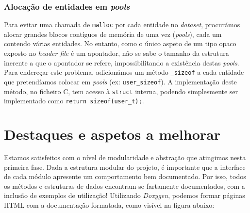 \documentclass[12pt, a4paper]{article}
\begin{document}
\subsubsection{Alocação de entidades em \emph{pools}}

Para evitar uma chamada de \texttt{malloc} por cada entidade no \emph{dataset}, procurámos alocar
grandes blocos contíguos de memória de uma vez (\emph{pools}), cada um contendo várias entidades.
No entanto, como o único aspeto de um tipo opaco exposto no \emph{header file} é um apontador, não
se sabe o tamanho da estrutura inerente a que o apontador se refere, impossibilitando a existência
destas \emph{pools}. Para endereçar este problema, adicionámos um método \texttt{\_sizeof} a cada
entidade que pretendíamos colocar em \emph{pools} (ex: \texttt{user\_sizeof}). A implementação
deste método, no ficheiro C, tem acesso à \texttt{struct} interna, podendo simplesmente ser
implementado como \texttt{return sizeof(user\_t);}.

\section{Destaques e aspetos a melhorar}

Estamos satisfeitos com o nível de modularidade e abstração que atingimos nesta primeira fase.
Dada a estrutura modular do projeto, é importante que a interface de cada módulo apresente um
comportamento bem documentado. Por isso, todos os métodos e estruturas de dados encontram-se
fartamente documentados, com a inclusão de exemplos de utilização! Utilizando \emph{Doxygen},
podemos formar páginas HTML com a documentação formatada, como visível na figura abaixo:
\end{document}
